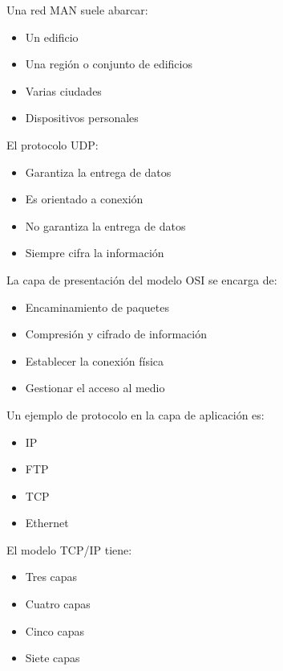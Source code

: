 \documentclass[11pt]{article}
\begin{document}
Una red MAN suele abarcar:

\begin{itemize}
\item Un edificio

\item Una región o conjunto de edificios

\item Varias ciudades

\item Dispositivos personales
\end{itemize}

El protocolo UDP:

\begin{itemize}
\item Garantiza la entrega de datos

\item Es orientado a conexión

\item No garantiza la entrega de datos

\item Siempre cifra la información
\end{itemize}

La capa de presentación del modelo OSI se encarga de:

\begin{itemize}
\item Encaminamiento de paquetes

\item Compresión y cifrado de información

\item Establecer la conexión física

\item Gestionar el acceso al medio
\end{itemize}

Un ejemplo de protocolo en la capa de aplicación es:

\begin{itemize}
\item IP

\item FTP

\item TCP

\item Ethernet
\end{itemize}

El modelo TCP/IP tiene:

\begin{itemize}
\item Tres capas

\item Cuatro capas

\item Cinco capas

\item Siete capas
\end{itemize}
\end{document}

